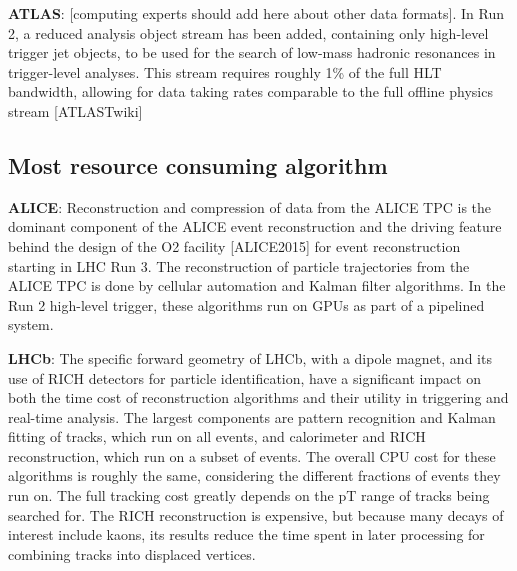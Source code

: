 \vskip 0.5cm
\noindent
{\bf ATLAS}: [computing experts should add here about other data formats]. In Run 2, a reduced analysis object stream has been added, containing only high-level trigger jet objects, to be used for the search of low-mass hadronic resonances in trigger-level analyses. This stream requires roughly 1\% of the full HLT bandwidth, allowing for data taking rates comparable to the full offline physics stream [ATLASTwiki] 

\subsection{Most resource consuming algorithm}
{\bf ALICE}: Reconstruction and compression of data from the ALICE TPC is the dominant component of the ALICE event reconstruction and the driving feature behind the design of the O2 facility [ALICE2015] for event reconstruction starting in LHC Run 3. The reconstruction of particle trajectories from the ALICE TPC is done by cellular automation and Kalman filter algorithms. In the Run 2 high-level trigger, these algorithms run on GPUs as part of a pipelined system.

\vskip 0.5cm
\noindent
{\bf LHCb}: The specific forward geometry of LHCb, with a dipole magnet, and its use of RICH detectors for particle identification, have a significant impact on both the time cost of reconstruction algorithms and their utility in triggering and real-time analysis. The largest components are pattern recognition and Kalman fitting of tracks, which run on all events, and calorimeter and RICH reconstruction, which run on a subset of events. The overall CPU cost for these algorithms is roughly the same, considering the different fractions of events they run on. The full tracking cost greatly depends on the pT range of tracks being searched for. The RICH reconstruction is expensive, but because many decays of interest include kaons, its results reduce the time spent in later processing for combining tracks into displaced vertices.

